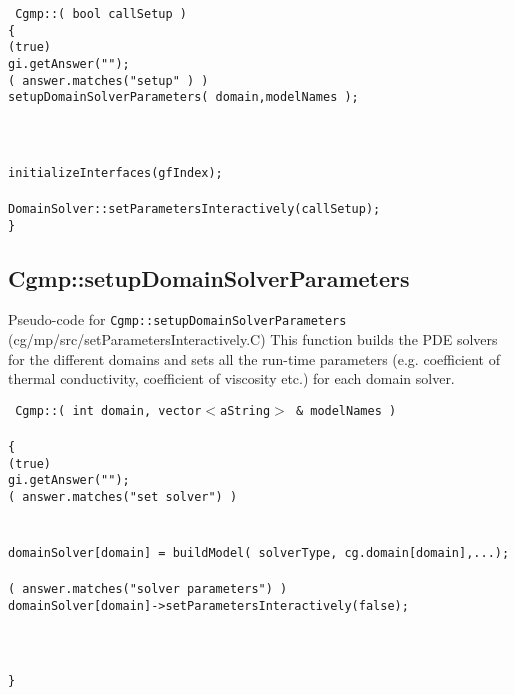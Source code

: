 \begin{flushleft}\tt\small
Cgmp::( bool callSetup ) \\
\{  \\
\ia  \WHILE(true)  \\
\ib    gi.getAnswer(""); \\
\ib    \IF( answer.matches("setup" )  ) \\
\ic      setupDomainSolverParameters( domain,modelNames );  \\
\ib    \END \\
\ia  \END \\
\ia \\
\ia initializeInterfaces(gfIndex);    \\
\ia\\
\ia DomainSolver::setParametersInteractively(callSetup);  \\
\}
\end{flushleft}

\subsection{Cgmp::setupDomainSolverParameters}
Pseudo-code for {\tt Cgmp::setupDomainSolverParameters} (cg/mp/src/setParametersInteractively.C)
This function builds the PDE solvers for the different domains and sets all the run-time parameters (e.g. coefficient of thermal conductivity, coefficient
of viscosity etc.) for each domain solver.

\begin{flushleft}\tt\small
Cgmp::( int domain, vector$<$aString$>$ \& modelNames ) \\
\\
\{  \\
\ia  \WHILE(true)  \\
\ib    gi.getAnswer(""); \\
\ib    \IF( answer.matches("set solver")  ) \\
\ib \\
\ic      {} \\
\ic      domainSolver[domain] = buildModel( solverType, cg.domain[domain],...);  \\
\ib \\
\ib    \ELSEIF( answer.matches("solver parameters") ) \\
\ic      domainSolver[domain]->setParametersInteractively(false);  \\
\ib    \END \\
\ia  \END \\
\ia \\
\}
\end{flushleft}


